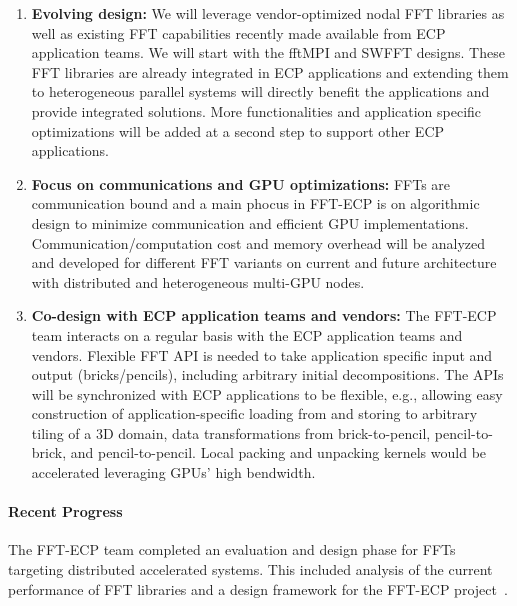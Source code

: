 \begin{enumerate}
\item
\textbf{Evolving design:}
We will leverage vendor-optimized nodal FFT libraries as well as existing 
FFT capabilities recently made available from ECP application teams.
We will start with the fftMPI and SWFFT designs. These FFT libraries
are already integrated in ECP applications and extending them to
heterogeneous parallel systems will directly benefit the applications
and provide integrated solutions. More functionalities and application
specific optimizations will be added at a second step to support other 
ECP applications. 
\item
\textbf{Focus on communications and GPU optimizations:}
FFTs are communication bound and a main phocus in FFT-ECP is on algorithmic
design to minimize communication and efficient GPU implementations. 
Communication/computation cost and memory overhead will be analyzed and developed
for different FFT variants on current and future architecture with distributed 
and heterogeneous multi-GPU nodes. 
\item
\textbf{Co-design with ECP application teams and vendors:}
The FFT-ECP team interacts on a regular basis with the ECP application teams
and vendors. Flexible FFT API is needed to take application specific input and 
output (bricks/pencils), including arbitrary initial decompositions. 
The APIs will be synchronized with ECP applications to be flexible, e.g., 
allowing easy construction of application-specific loading from 
and storing to arbitrary tiling of a 3D domain, data transformations from 
brick-to-pencil, pencil-to-brick, and pencil-to-pencil. Local packing and 
unpacking kernels would be accelerated leveraging GPUs' high bendwidth.
\end{enumerate}

\paragraph{Recent Progress}
The FFT-ECP team completed an evaluation and design phase for FFTs targeting distributed 
accelerated systems. This included analysis of the current performance of FFT 
libraries and a design framework for the FFT-ECP project~\cite{thsd2018ECPFFT}. 



